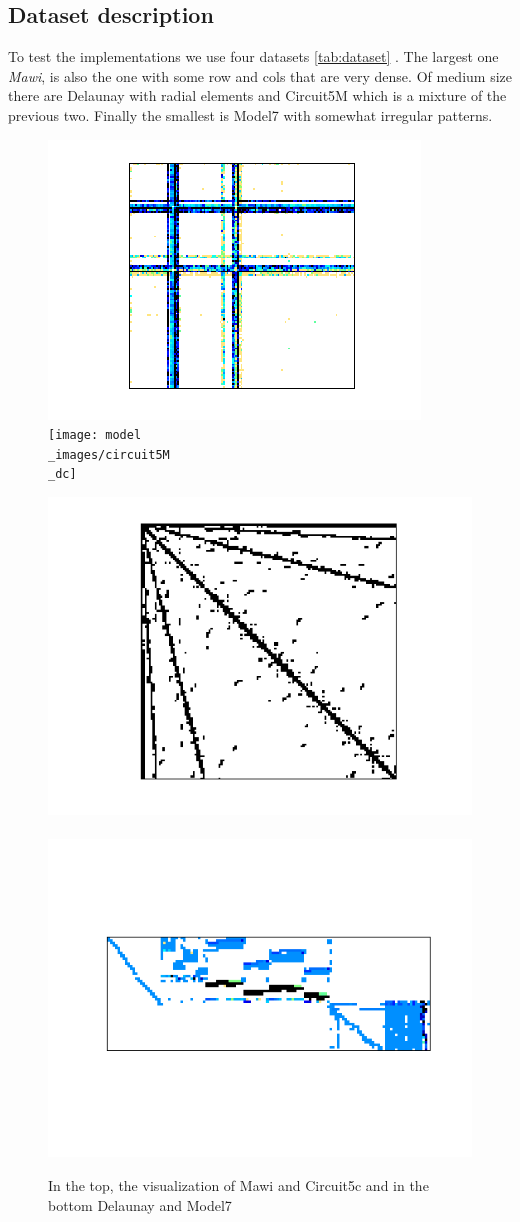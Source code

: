\documentclass[conference]{IEEEtran}
\begin{document}
\subsection{Dataset description}

To test the implementations we use four datasets \ref{tab:dataset} . The largest one \textit{Mawi}, is also the one with some row and cols that are very dense. Of medium size there are Delaunay with radial elements and Circuit5M which is a mixture of the previous two. Finally the smallest is Model7 with somewhat irregular patterns.
\FloatBarrier
\begin{figure}
	\centering
	\includegraphics[width=0.3\linewidth]{model_images/mawi_201512020330}
	\label{dat:mawi}
	~
	\texttt{[image: model\\\_images/circuit5M\\\_dc]}
	\label{dat:circuit}

	\includegraphics[width=0.3\linewidth]{model_images/delaunay_n23}
	\label{dat:delaunay}
	~
	\includegraphics[width=0.3\linewidth]{model_images/model7}
	\label{dat:model7}

	\caption{In the top, the visualization of Mawi and Circuit5c and in the bottom Delaunay and Model7}
	\label{img:data-vis}
\end{figure}
\end{document}
